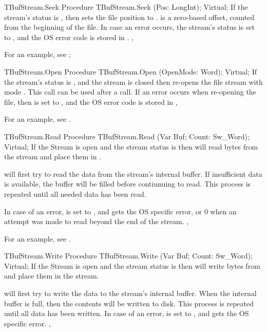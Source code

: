 \begin{procedure}{TBufStream.Seek}
\Declaration
Procedure TBufStream.Seek (Pos: LongInt); Virtual;
\Description
If the stream's status is , then  sets the 
file position to .  is a zero-based offset, counted from
the beginning of the file.
\Errors
In case an error occurs, the stream's status is set to ,
and the OS error code is stored in .
\SeeAlso
{}, 
\end{procedure}

For an example, see ;

\begin{procedure}{TBufStream.Open}
\Declaration
Procedure TBufStream.Open (OpenMode: Word); Virtual;
\Description
If the stream's status is , and the stream is closed then
 re-opens the file stream with mode .
This call can be used after a  call.
\Errors
If an error occurs when re-opening the file, then  is set
to , and the OS error code is stored in 
\SeeAlso
{}, 
\end{procedure}

For an example, see .

\begin{procedure}{TBufStream.Read}
\Declaration
Procedure TBufStream.Read (Var Buf; Count: Sw\_Word); Virtual;
\Description
If the Stream is open and the stream status is  then 
 will read  bytes from the stream and place them
in  .

 will first try to read the data from the stream's internal
buffer. If insufficient data is available, the buffer will be filled before
contiunuing to read. This process is repeated until all needed data 
has been read.

\Errors
In case of an error,  is set to , and
 gets the OS specific error, or 0 when an attempt was
made to read beyond the end of the stream.
\SeeAlso
{}, 
\end{procedure}

For an example, see .

\begin{procedure}{TBufStream.Write}
\Declaration
Procedure TBufStream.Write (Var Buf; Count: Sw\_Word); Virtual;
\Description
If the Stream is open and the stream status is  then 
 will write  bytes from  and place them
in the stream.

 will first try to write the data to the stream's internal
buffer. When the internal buffer is full, then the contents will be written 
to disk. This process is repeated until all data has been written.
\Errors
In case of an error,  is set to , and
 gets the OS specific error.
\SeeAlso
{}, 
\end{procedure}

